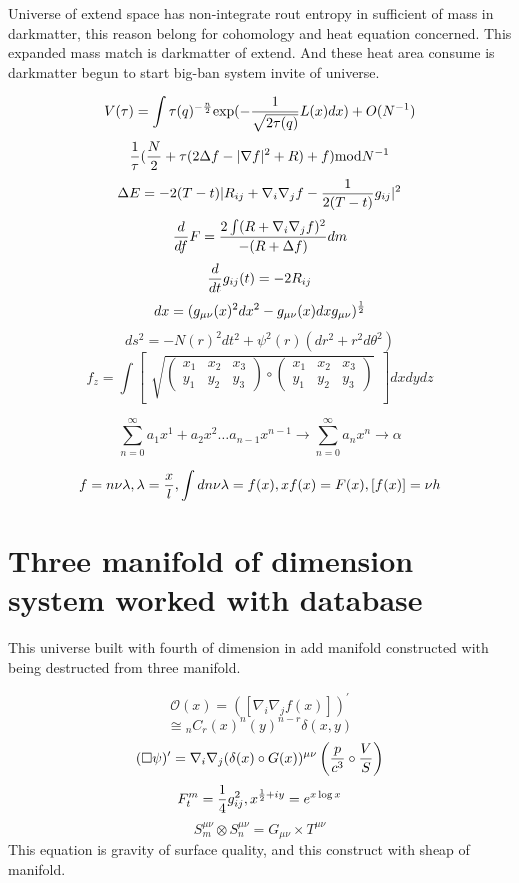 \documentclass{jsarticle}
\begin{document}
  Universe of extend space has non-integrate rout entropy in sufficient of mass in darkmatter,
this reason belong for cohomology and heat equation concerned. This expanded mass match is darkmatter
of extend. And these heat area consume is darkmatter begun to start big-ban system invite of universe.

$$ V(\tau) = \int \tau(q)^{-{n \over 2}} \mathrm{exp}(-{1 \over \sqrt{2 \tau(q)}}L(x)dx) + O(N^{-1}) $$
$$ {1 \over \tau}({N \over 2} + \tau(2 \Delta f - |\nabla f|^2 + R) + f)\mathrm{mod}N^{-1} $$
	$$ \Delta E = -2(T - t)|R_{ij} + \nabla_{i} \nabla_{j} f - {1 \over 2(T - t)}g_{ij}|^2 $$
	$$ {d \over df}F = {2\int (R + \nabla_{i} \nabla_{j} f)^2 \over - (R + \Delta f)}dm $$
	$$ {d \over dt}g_{ij}(t) = - 2 R_{ij} $$
	$$ dx = (g_{\mu\nu}(x)^2dx^2 - g_{\mu\nu}(x)dxg_{\mu\nu})^{1 \over 2} $$
	$$ ds^2 = - N(r)^2dt^2 + \psi^2(r)(dr^2 + r^2d\theta^2) $$
  $$ f_{z} = \int \begin{bmatrix} \sqrt{\begin{pmatrix} x_{1} & x_{2} & x_{3} \\
     y_{1} & y_{2} & y_{3} \end{pmatrix}
     \circ
   \begin{pmatrix} x_{1} & x_{2} & x_{3} \\
     y_{1} & y_{2} & y_{3} \end{pmatrix}}_{}
     \end{bmatrix}dxdydz $$

     $$ \sum^{\infty}_{n=0}a_1x^1 + a_2x^2 \dots a_{n-1}x^{n-1} \to \sum^{\infty}_{n=0} a_nx^n \to \alpha $$

$$ f = n\nu\lambda , \lambda = {x \over l},
 \int dn \nu \lambda = f(x), 
 xf(x) = F(x),
 [f(x)] = \nu h$$

\section{Three manifold of dimension system worked with database}
  This universe built with fourth of dimension in add manifold constructed with being destructed from three manifold.

$$ \mathcal{O}(x) = \left( [\nabla_{i}\nabla_{j}f(x)]\right)^{'} $$
$$  \cong {}_{n}C_{r}(x)^{n}(y)^{n-r} \delta(x,y) $$
$$ (\square \psi)' = \nabla_{i}\nabla_{j}(\delta(x) \circ G(x))^{\mu\nu} \left({p \over c^3} \circ 
{V \over S} \right) $$
$$ F^m_t = {1 \over 4}g^{2}_{ij}, x^{{1 \over 2} + iy} = e^{x \log x} $$
$$ S^{\mu\nu}_m \otimes S^{\mu\nu}_n = G_{\mu\nu} \times T^{\mu\nu} $$
This equation is gravity of surface quality, and this construct with sheap of manifold.
\end{document}
